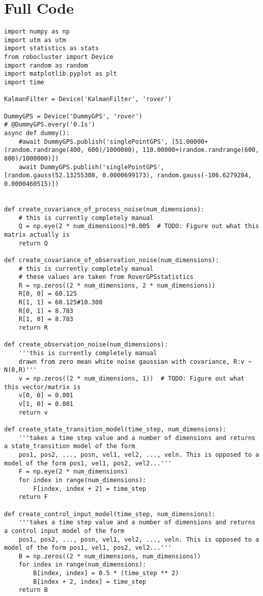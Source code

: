 \documentclass{article}
\begin{document}
\section{Full Code}
\begin{lstlisting}
import numpy as np
import utm as utm
import statistics as stats
from robocluster import Device
import random as random
import matplotlib.pyplot as plt
import time

KalmanFilter = Device('KalmanFilter', 'rover')

DummyGPS = Device('DummyGPS', 'rover')
# @DummyGPS.every('0.1s')
async def dummy():
    #await DummyGPS.publish('singlePointGPS', [51.00000+(random.randrange(400, 600)/1000000), 110.00000+(random.randrange(600, 800)/1000000)])
    await DummyGPS.publish('singlePointGPS', [random.gauss(52.13255308, 0.0000699173), random.gauss(-106.6279284, 0.0000460515)])


def create_covariance_of_process_noise(num_dimensions):
    # this is currently completely manual
    Q = np.eye(2 * num_dimensions)*0.005  # TODO: Figure out what this matrix actually is
    return Q

def create_covariance_of_observation_noise(num_dimensions):
    # this is currently completely manual
    # these values are taken from RoverGPSstatistics
    R = np.zeros((2 * num_dimensions, 2 * num_dimensions))
    R[0, 0] = 60.125
    R[1, 1] = 60.125#10.308
    R[0, 1] = 8.783
    R[1, 0] = 8.783
    return R

def create_observation_noise(num_dimensions):
    '''this is currently completely manual
    drawn from zero mean white noise gaussian with covariance, R:v ~ N(0,R)'''
    v = np.zeros((2 * num_dimensions, 1))  # TODO: Figure out what this vector/matrix is
    v[0, 0] = 0.001
    v[1, 0] = 0.001
    return v

def create_state_transition_model(time_step, num_dimensions):
    '''takes a time step value and a number of dimensions and returns a state_transition model of the form
    pos1, pos2, ..., posn, vel1, vel2, ..., veln. This is opposed to a model of the form pos1, vel1, pos2, vel2...'''
    F = np.eye(2 * num_dimensions)
    for index in range(num_dimensions):
        F[index, index + 2] = time_step
    return F

def create_control_input_model(time_step, num_dimensions):
    '''takes a time step value and a number of dimensions and returns a control input model of the form
    pos1, pos2, ..., posn, vel1, vel2, ..., veln. This is opposed to a model of the form pos1, vel1, pos2, vel2...'''
    B = np.zeros((2 * num_dimensions, num_dimensions))
    for index in range(num_dimensions):
        B[index, index] = 0.5 * (time_step ** 2)
        B[index + 2, index] = time_step
    return B


\end{lstlisting}
\end{document}
